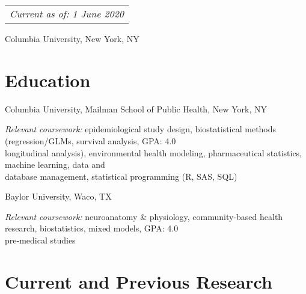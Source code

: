 \documentclass[hidelinks,10pt]{my_cv}
\begin{document}
\null\hfill\begin{tabular}[t]{l@{}}
  \textit{Current as of: 1 June 2020}
\end{tabular}


\centerline{Columbia University, New York, NY}

\section{Education}

	Columbia University, Mailman School of Public Health, New York, NY%

	\vspace{2mm}

	{\textit{Relevant coursework:} epidemiological study design, biostatistical methods (regression/GLMs, survival analysis, \hfill   GPA: 4.0} 
	\\{longitudinal analysis), environmental health modeling, pharmaceutical statistics, machine learning, data and}
	\\{database management, statistical programming (R, SAS, SQL)}

	Baylor University, Waco, TX

	\vspace{2mm}
	
	{\textit{Relevant coursework:} neuroanatomy \& physiology, community-based health research, biostatistics, mixed models,	\hfill GPA: 4.0}
	\\{pre-medical studies}


\section{Current and Previous Research}
\end{document}

